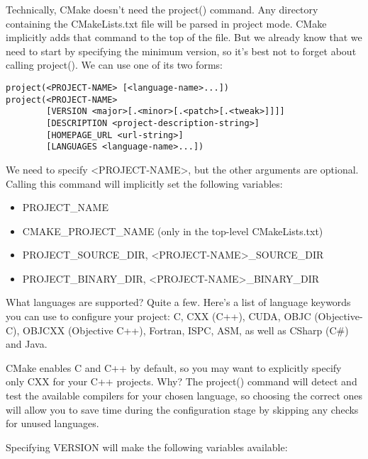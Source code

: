 
Technically, CMake doesn't need the project() command. Any directory containing the CMakeLists.txt file will be parsed in project mode. CMake implicitly adds that command to the top of the file. But we already know that we need to start by specifying the minimum version, so it's best not to forget about calling project(). We can use one of its two forms:

\begin{lstlisting}[style=styleCMake]
project(<PROJECT-NAME> [<language-name>...])
project(<PROJECT-NAME>
		[VERSION <major>[.<minor>[.<patch>[.<tweak>]]]]
		[DESCRIPTION <project-description-string>]
		[HOMEPAGE_URL <url-string>]
		[LANGUAGES <language-name>...])
\end{lstlisting}

We need to specify <PROJECT-NAME>, but the other arguments are optional. Calling this command will implicitly set the following variables:

\begin{itemize}
\item 
PROJECT\_NAME

\item 
CMAKE\_PROJECT\_NAME (only in the top-level CMakeLists.txt)

\item 
PROJECT\_SOURCE\_DIR, <PROJECT-NAME>\_SOURCE\_DIR

\item 
PROJECT\_BINARY\_DIR, <PROJECT-NAME>\_BINARY\_DIR
\end{itemize}

What languages are supported? Quite a few. Here's a list of language keywords you can use to configure your project: C, CXX (C++), CUDA, OBJC (Objective-C), OBJCXX (Objective C++), Fortran, ISPC, ASM, as well as CSharp (C\#) and Java.

CMake enables C and C++ by default, so you may want to explicitly specify only CXX for your C++ projects. Why? The project() command will detect and test the available compilers for your chosen language, so choosing the correct ones will allow you to save time during the configuration stage by skipping any checks for unused languages.

Specifying VERSION will make the following variables available:

